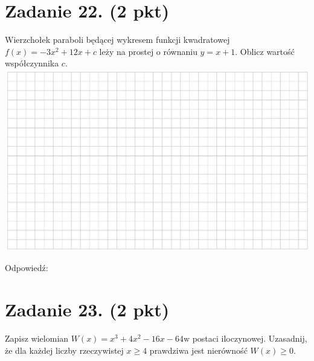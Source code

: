 \documentclass[10pt]{article}
\begin{document}
\section*{Zadanie 22. (2 pkt)}
Wierzchołek paraboli będącej wykresem funkcji kwadratowej \(f(x)=-3 x^{2}+12 x+c\) leży na prostej o równaniu \(y=x+1\). Oblicz wartość współczynnika \(c\).\\
\includegraphics[max width=\textwidth, center]{2024_11_21_6438f6dbc3784fe6d1deg-08(8)}

Odpowiedź: \(\qquad\)

\section*{Zadanie 23. (2 pkt)}
Zapisz wielomian \(W(x)=x^{3}+4 x^{2}-16 x-64 \mathrm{w}\) postaci iloczynowej. Uzasadnij, że dla każdej liczby rzeczywistej \(x \geq 4\) prawdziwa jest nierówność \(W(x) \geq 0\).
\end{document}
